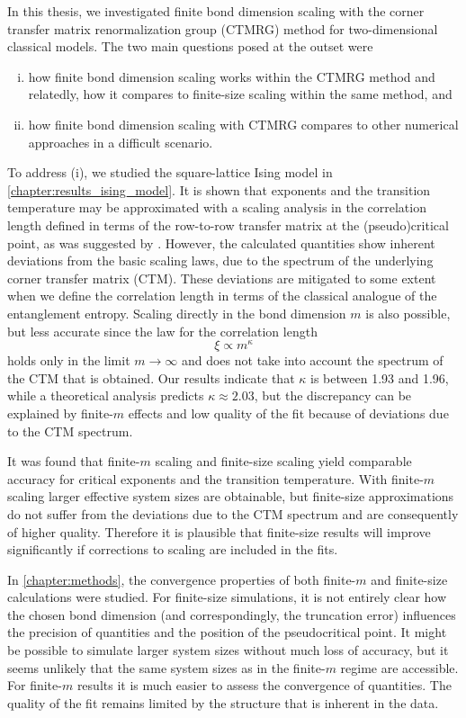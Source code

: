 In this thesis, we investigated finite bond dimension scaling with the corner transfer matrix renormalization group
(CTMRG) method for two-dimensional classical models.
The two main questions posed at the outset were
\begin{enumerate}[(i)]
  \item how finite bond dimension scaling works within the CTMRG method
  and relatedly, how it compares to finite-size scaling within the same method, and
  \item how finite bond dimension scaling with CTMRG compares to other numerical approaches in a difficult scenario.
\end{enumerate}

To address (i), we studied the square-lattice Ising model in \autoref{chapter:results_ising_model}.
It is shown that exponents and the transition temperature may be approximated with a scaling analysis in
the correlation length defined in terms of the row-to-row transfer matrix at the (pseudo)critical point,
as was suggested by \cite{nishino1996numerical}.
However, the calculated quantities show inherent deviations from the basic scaling laws,
due to the spectrum of the underlying corner transfer matrix (CTM).
These deviations are mitigated to some extent when we define the correlation length in terms of the classical analogue
of the entanglement entropy.
Scaling directly in the bond dimension $m$ is also possible, but less accurate since the law for the correlation
length
\begin{equation*}
  \xi \propto m^{\kappa}
\end{equation*}
holds only in the limit $m \to \infty$ and does not take into account the spectrum of the CTM that is obtained.
Our results indicate that $\kappa$ is between 1.93 and 1.96, while a theoretical analysis \cite{pollmann2009theory}
predicts $\kappa \approx 2.03$, but the discrepancy can be explained by finite-$m$ effects and low quality of the fit
because of deviations due to the CTM spectrum.

It was found that finite-$m$ scaling and finite-size scaling yield comparable accuracy for critical exponents and the
transition temperature.
With finite-$m$ scaling larger effective system sizes are obtainable,
but finite-size approximations do not suffer from the deviations due to the CTM spectrum and are
consequently of higher quality. Therefore it is plausible that finite-size results will improve significantly if
corrections to scaling are included in the fits.

In \autoref{chapter:methods}, the convergence properties of both finite-$m$ and finite-size calculations were studied.
For finite-size simulations, it is not entirely clear how the chosen bond dimension (and correspondingly,
the truncation error) influences the precision of quantities and the position of the pseudocritical point.
It might be possible to simulate larger system sizes without much loss of accuracy,
but it seems unlikely that the same system sizes as in the finite-$m$ regime are accessible.
For finite-$m$ results it is much easier to assess the convergence of quantities.
The quality of the fit remains limited by the structure that is inherent in the data.

